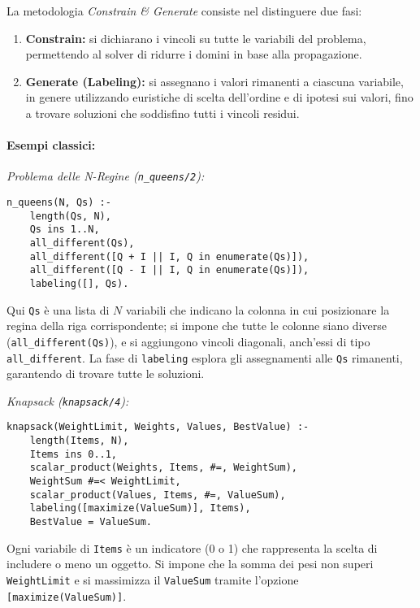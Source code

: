 \documentclass[12pt]{article}
\begin{document}
La metodologia \emph{Constrain \& Generate} consiste nel distinguere due fasi:
\begin{enumerate}
  \item \textbf{Constrain:} si dichiarano i vincoli su tutte le variabili del problema, permettendo al solver di ridurre i domini in base alla propagazione.
  \item \textbf{Generate (Labeling):} si assegnano i valori rimanenti a ciascuna variabile, in genere utilizzando euristiche di scelta dell'ordine e di ipotesi sui valori, fino a trovare soluzioni che soddisfino tutti i vincoli residui.
\end{enumerate}

\paragraph{Esempi classici:}

\emph{Problema delle N-Regine (\texttt{n\_queens/2}):}
\begin{verbatim}
n_queens(N, Qs) :-
    length(Qs, N),
    Qs ins 1..N,
    all_different(Qs),
    all_different([Q + I || I, Q in enumerate(Qs)]),
    all_different([Q - I || I, Q in enumerate(Qs)]),
    labeling([], Qs).
\end{verbatim}
Qui \texttt{Qs} è una lista di $N$ variabili che indicano la colonna in cui posizionare la regina della riga corrispondente; si impone che tutte le colonne siano diverse (\texttt{all_different(Qs)}), e si aggiungono vincoli diagonali, anch'essi di tipo \texttt{all_different}. La fase di \texttt{labeling} esplora gli assegnamenti alle \texttt{Qs} rimanenti, garantendo di trovare tutte le soluzioni.

\emph{Knapsack (\texttt{knapsack/4}):}
\begin{verbatim}
knapsack(WeightLimit, Weights, Values, BestValue) :-
    length(Items, N),
    Items ins 0..1,
    scalar_product(Weights, Items, #=, WeightSum),
    WeightSum #=< WeightLimit,
    scalar_product(Values, Items, #=, ValueSum),
    labeling([maximize(ValueSum)], Items),
    BestValue = ValueSum.
\end{verbatim}
Ogni variabile di \texttt{Items} è un indicatore (0 o 1) che rappresenta la scelta di includere o meno un oggetto. Si impone che la somma dei pesi non superi \texttt{WeightLimit} e si massimizza il \texttt{ValueSum} tramite l'opzione \texttt{[maximize(ValueSum)]}.
\end{document}

